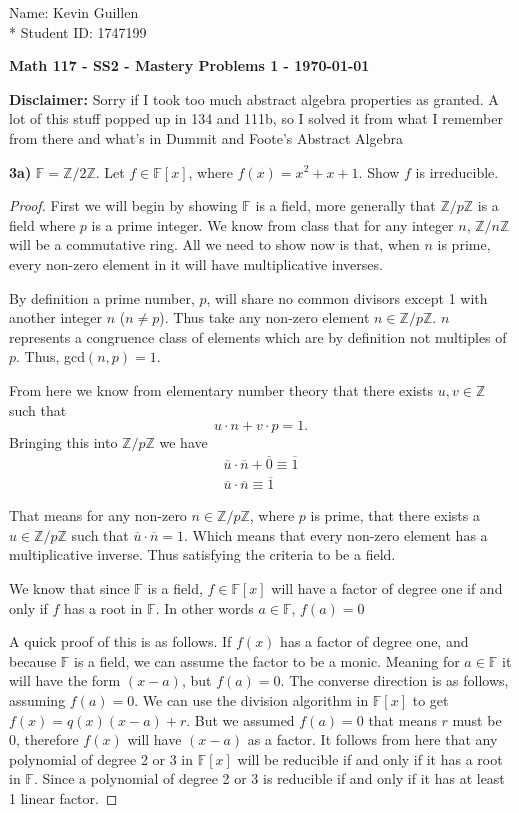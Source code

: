 \documentclass[12pt]{article}
\newcommand      {\Zm}         {{\mathbb Z}}
\newcommand      {\Fm}         {{\mathbb F}}
\begin{document}
\begin{flushright}
    Name: Kevin Guillen \\*
    Student ID: 1747199
\end{flushright}
\begin{center}
    {\bf Math 117 - SS2 - Mastery Problems 1 - \today}
\end{center}

\textbf{Disclaimer:} Sorry if I took too much abstract algebra properties as granted. A lot of this stuff popped up in 134 and 111b, so I solved it from what I remember from there and what's in Dummit and Foote's Abstract Algebra

\noindent \textbf{3a) } $\mathbb{F} = \Zm/2\Zm$. Let $f\in \mathbb{F}[x]$, where $f(x) = x^2 + x + 1$. Show $f$ is irreducible.
\begin{proof}
    First we will begin by showing $\Fm$ is a field, more generally that $\Zm/p\Zm$ is a field where $p$ is a prime integer. We know from class that for any integer $n$, $\Zm/n\Zm$ will be a commutative ring. All we need to show now is that, when $n$ is prime, every non-zero element in it will have multiplicative inverses. 

    By definition a prime number, $p$, will share no common divisors except 1 with another integer $n$ ($n\neq p$). Thus take any non-zero element $n \in \Zm/p\Zm$. $n$ represents a congruence class of elements which are by definition not multiples of $p$. Thus, gcd$(n,p) = 1$. 

    From here we know from elementary number theory that there exists $u,v\in\Zm$ such that \[u\cdot n + v\cdot p = 1.\] Bringing this into $\Zm/p\Zm$ we have
    \begin{align*}
        \overline{u}\cdot \overline{n} + \overline{0} \equiv \overline{1} \\
        \overline{u}\cdot \overline{n} \equiv \overline{1}
    \end{align*}

    That means for any non-zero $n\in \Zm/p\Zm$, where $p$ is prime, that there exists a $u\in \Zm/p\Zm$ such that $\overline{u}\cdot \overline{n}= 1 $. Which means that every non-zero element has a multiplicative inverse. Thus satisfying the criteria to be a field. 

    We know that since $\Fm$ is a field, $f\in \Fm[x]$ will have a factor of degree one if and only if $f$ has a root in $\Fm$. In other words $a\in \Fm$, $f(a) = 0$ 
    
    A quick proof of this is as follows. If $f(x)$ has a factor of degree one, and because $\Fm$ is a field, we can assume the factor to be a monic. Meaning for $a\in\Fm$ it will have the form $(x-a)$, but $f(a) = 0$. The converse direction is as follows, assuming $f(a) = 0$. We can use the division algorithm in $\Fm[x]$ to get $f(x) = q(x)(x-a) + r$. But we assumed $f(a) = 0$ that means $r$ must be 0, therefore $f(x)$ will have $(x-a)$ as a factor. It follows from here that any polynomial of degree 2 or 3 in $\Fm[x]$ will be reducible if and only if it has a root in $\Fm$. Since a polynomial of degree 2 or 3 is reducible if and only if it has at least 1 linear factor. 


\end{proof}
\end{document}
